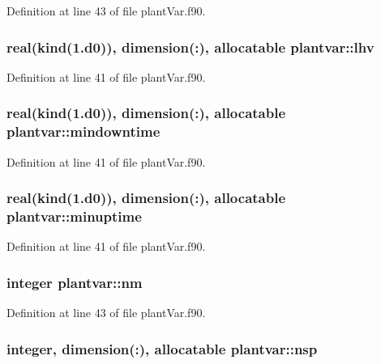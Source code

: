 Definition at line 43 of file plant\-Var.\-f90.

\hypertarget{classplantvar_a7c8060d92515eb94b517dbd9f9d93801}{
\subsubsection[{lhv}]{\setlength{\rightskip}{0pt plus 5cm}real(kind(1.d0)), dimension(\-:), allocatable plantvar\-::lhv}}\label{classplantvar_a7c8060d92515eb94b517dbd9f9d93801}


Definition at line 41 of file plant\-Var.\-f90.

\hypertarget{classplantvar_af23a22d3c3cd5bff0845e7110615e6ae}{
\subsubsection[{mindowntime}]{\setlength{\rightskip}{0pt plus 5cm}real(kind(1.d0)), dimension(\-:), allocatable plantvar\-::mindowntime}}\label{classplantvar_af23a22d3c3cd5bff0845e7110615e6ae}


Definition at line 41 of file plant\-Var.\-f90.

\hypertarget{classplantvar_a73cafc729d430c73ded6746bd7809315}{
\subsubsection[{minuptime}]{\setlength{\rightskip}{0pt plus 5cm}real(kind(1.d0)), dimension(\-:), allocatable plantvar\-::minuptime}}\label{classplantvar_a73cafc729d430c73ded6746bd7809315}


Definition at line 41 of file plant\-Var.\-f90.

\hypertarget{classplantvar_a137041d7f1c30cc7d248b9ada4feab69}{
\subsubsection[{nm}]{\setlength{\rightskip}{0pt plus 5cm}integer plantvar\-::nm}}\label{classplantvar_a137041d7f1c30cc7d248b9ada4feab69}


Definition at line 43 of file plant\-Var.\-f90.

\hypertarget{classplantvar_a16e98f1a836d4de3e5436365e77441b0}{
\subsubsection[{nsp}]{\setlength{\rightskip}{0pt plus 5cm}integer, dimension(\-:), allocatable plantvar\-::nsp}}\label{classplantvar_a16e98f1a836d4de3e5436365e77441b0}


